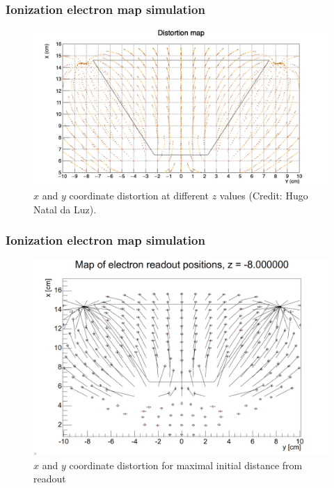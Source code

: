 \documentclass{beamer}
\begin{document}
	\begin{frame}
		\frametitle{Ionization electron map simulation}
		\begin{figure}
			\centering
			\includegraphics[height=0.6\textheight]{images/map_dist.png}
			\caption{$x$ and $y$ coordinate distortion at different $z$ values (Credit: Hugo Natal da Luz).}
		\end{figure}
	\end{frame}
	\begin{frame}
		\frametitle{Ionization electron map simulation}
		\begin{figure}
			\centering
			\includegraphics[height=0.65\textheight]{images/map_dist2.png}
			\caption{$x$ and $y$ coordinate distortion for maximal initial distance from readout}
		\end{figure}
	\end{frame}
\end{document}
